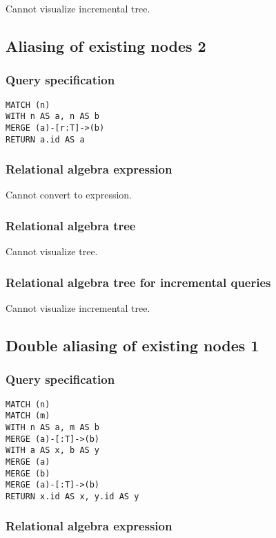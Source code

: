 Cannot visualize incremental tree.

\subsection{Aliasing of existing nodes 2}

\subsubsection*{Query specification}

\begin{lstlisting}
MATCH (n)
WITH n AS a, n AS b
MERGE (a)-[r:T]->(b)
RETURN a.id AS a
\end{lstlisting}

\subsubsection*{Relational algebra expression}

Cannot convert to expression.

\subsubsection*{Relational algebra tree}

Cannot visualize tree.

\subsubsection*{Relational algebra tree for incremental queries}

Cannot visualize incremental tree.

\subsection{Double aliasing of existing nodes 1}

\subsubsection*{Query specification}

\begin{lstlisting}
MATCH (n)
MATCH (m)
WITH n AS a, m AS b
MERGE (a)-[:T]->(b)
WITH a AS x, b AS y
MERGE (a)
MERGE (b)
MERGE (a)-[:T]->(b)
RETURN x.id AS x, y.id AS y
\end{lstlisting}

\subsubsection*{Relational algebra expression}

